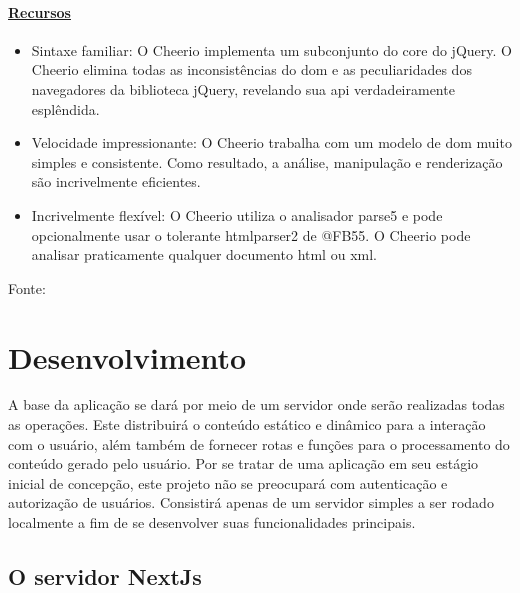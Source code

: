 \subsubsection{\underline{Recursos}}

\begin{itemize}
        
	\item Sintaxe familiar: O Cheerio implementa um subconjunto do core do jQuery.
                O Cheerio elimina todas as inconsistências do
                \acrshort{dom}
                e as peculiaridades dos navegadores da biblioteca jQuery, revelando sua
                \acrshort{api}
                verdadeiramente esplêndida.
                
	\item Velocidade impressionante: O Cheerio trabalha com um modelo de 
                \acrshort{dom}
                muito simples e consistente. Como resultado, a análise, manipulação e renderização são incrivelmente eficientes.
                
	\item Incrivelmente flexível: O Cheerio utiliza o analisador parse5 e pode opcionalmente usar o tolerante htmlparser2 de @FB55. O Cheerio pode analisar praticamente qualquer documento
                \acrshort{html}
                ou
                \acrshort{xml}.
                
    
\end{itemize}

Fonte:
\cite{cheerio}

\chapter{Desenvolvimento}

A base da aplicação se dará por meio de um servidor onde serão realizadas
todas as operações. Este distribuirá o conteúdo estático e dinâmico
para a interação com o usuário, além também de fornecer rotas e funções
para o processamento do conteúdo gerado pelo usuário.
Por se tratar de uma aplicação em seu estágio inicial de concepção,
este projeto não se preocupará com autenticação e autorização de usuários.
Consistirá apenas de um servidor simples a ser rodado localmente a fim de
se desenvolver suas funcionalidades principais.

\section{O servidor NextJs}


